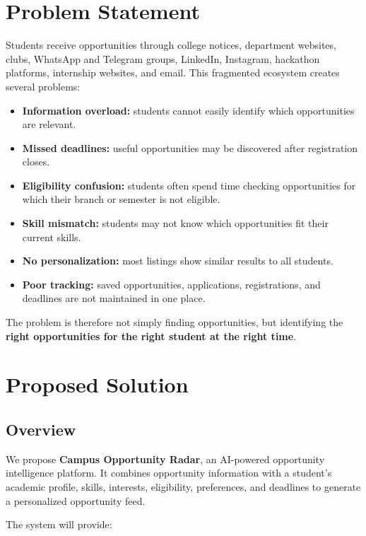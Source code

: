 \documentclass[11pt,a4paper]{article}
\begin{document}
\section{Problem Statement}

Students receive opportunities through college notices, department websites, clubs, WhatsApp and Telegram groups, LinkedIn, Instagram, hackathon platforms, internship websites, and email. This fragmented ecosystem creates several problems:

\begin{itemize}
\item \textbf{Information overload:} students cannot easily identify which opportunities are relevant.
\item \textbf{Missed deadlines:} useful opportunities may be discovered after registration closes.
\item \textbf{Eligibility confusion:} students often spend time checking opportunities for which their branch or semester is not eligible.
\item \textbf{Skill mismatch:} students may not know which opportunities fit their current skills.
\item \textbf{No personalization:} most listings show similar results to all students.
\item \textbf{Poor tracking:} saved opportunities, applications, registrations, and deadlines are not maintained in one place.
\end{itemize}

The problem is therefore not simply finding opportunities, but identifying the \textbf{right opportunities for the right student at the right time}.

\section{Proposed Solution}

\subsection{Overview}

We propose \textbf{Campus Opportunity Radar}, an AI-powered opportunity intelligence platform. It combines opportunity information with a student's academic profile, skills, interests, eligibility, preferences, and deadlines to generate a personalized opportunity feed.

The system will provide:
\end{document}
